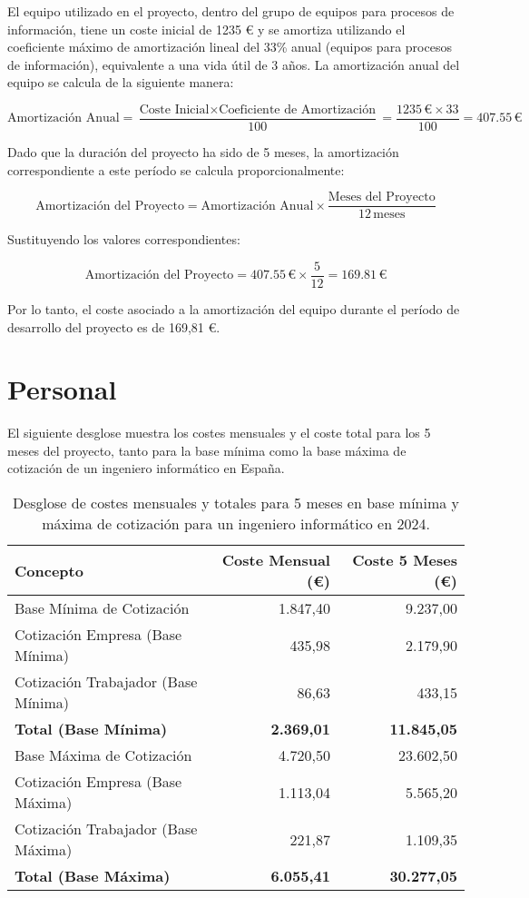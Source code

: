 El equipo utilizado en el proyecto, dentro del grupo de equipos para procesos de información, tiene un coste inicial de 1235 € y se amortiza utilizando el coeficiente máximo de amortización lineal del 33\% anual (equipos para procesos de información)\cite{amortizacion}, equivalente a una vida útil de 3 años. La amortización anual del equipo se calcula de la siguiente manera:

\[
\text{Amortización Anual} = \frac{\text{Coste Inicial} \times \text{Coeficiente de Amortización}}{100} = \frac{1235 \, \text{€} \times 33}{100} = 407.55 \, \text{€}
\]

Dado que la duración del proyecto ha sido de 5 meses, la amortización correspondiente a este período se calcula proporcionalmente:

\[
\text{Amortización del Proyecto} = \text{Amortización Anual} \times \frac{\text{Meses del Proyecto}}{12 \, \text{meses}}
\]

Sustituyendo los valores correspondientes:

\[
\text{Amortización del Proyecto} = 407.55 \, \text{€} \times \frac{5}{12} = 169.81 \, \text{€}
\]

Por lo tanto, el coste asociado a la amortización del equipo durante el período de desarrollo del proyecto es de 169,81 €.

\section{Personal}
El siguiente desglose muestra los costes mensuales y el coste total para los 5 meses del proyecto, tanto para la base mínima como la base máxima de cotización de un ingeniero informático en España\cite{cotizacion}.

\begin{table}[h!]
    \centering
    \begin{tabular}{lrr}
        \toprule
        \textbf{Concepto} & \textbf{Coste Mensual (€)} & \textbf{Coste 5 Meses (€)} \\
        \midrule
        Base Mínima de Cotización & 1.847,40 & 9.237,00 \\
        Cotización Empresa (Base Mínima) & 435,98 & 2.179,90 \\
        Cotización Trabajador (Base Mínima) & 86,63 & 433,15 \\
        \textbf{Total (Base Mínima)} & \textbf{2.369,01} & \textbf{11.845,05} \\
        \midrule
        Base Máxima de Cotización & 4.720,50 & 23.602,50 \\
        Cotización Empresa (Base Máxima) & 1.113,04 & 5.565,20 \\
        Cotización Trabajador (Base Máxima) & 221,87 & 1.109,35 \\
        \textbf{Total (Base Máxima)} & \textbf{6.055,41} & \textbf{30.277,05} \\
        \bottomrule
    \end{tabular}
    \caption{Desglose de costes mensuales y totales para 5 meses en base mínima y máxima de cotización para un ingeniero informático en 2024.}
    \end{table}
        

